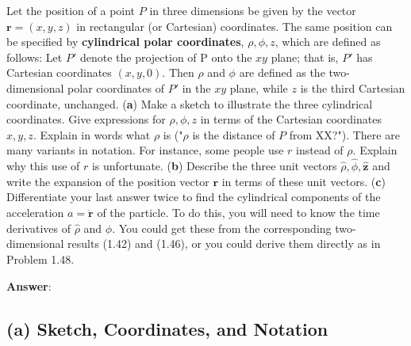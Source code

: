 \documentclass[11pt, a4paper]{article} %
\begin{document}
Let the position of a point $P$ in three dimensions be given by the vector $\mathbf{r} = (x,y,z)$ in rectangular (or Cartesian) coordinates. The same position can be specified by \textbf{cylindrical polar coordinates}, $\rho, \phi, z$, which are defined as follows: Let $P'$ denote the projection of P onto the $xy$ plane; that is, $P'$ has Cartesian coordinates $(x,y,0)$. Then $\rho$ and $\phi$ are defined as the two-dimensional polar coordinates of $P'$ in the $xy$ plane, while $z$ is the third Cartesian coordinate, unchanged. (\textbf{a}) Make a sketch to illustrate the three cylindrical coordinates. Give expressions for $\rho, \phi, z$ in terms of the Cartesian coordinates $x,y,z$. Explain in words what $\rho$ is ("$\rho$ is the distance of $P$ from XX?"). There are many variants in notation. For instance, some people use $r$ instead of $\rho$. Explain why this use of $r$ is unfortunate. (\textbf{b}) Describe the three unit vectors $\hat{\rho}, \hat{\phi}, \hat{\mathbf{z}}$ and write the expansion of the position vector $\mathbf{r}$ in terms of these unit vectors. (\textbf{c}) Differentiate your last answer twice to find the cylindrical components of the acceleration $a = \ddot{\mathbf{r}}$ of the particle. To do this, you will need to know the time derivatives of $\hat{\rho}$ and $\hat{\phi}$. You could get these from the corresponding two-dimensional results (1.42) and (1.46), or you could derive them directly as in Problem 1.48.

\textbf{Answer}:

\subsection*{(a) Sketch, Coordinates, and Notation}
\end{document}
